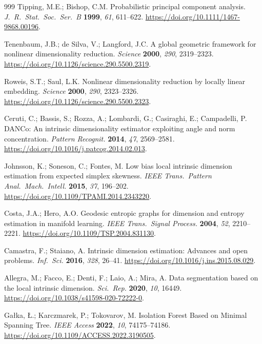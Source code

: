 \documentclass[make,article,submit,pdftex,moreauthors]{Definitions/mdpi}
\begin{document}
\begin{thebibliography}{999}
Tipping, M.E.; Bishop, C.M.
Probabilistic principal component analysis.
\textit{J.\ R.\ Stat.\ Soc.\ Ser.\ B} \textbf{1999}, \textit{61}, 611--622.
\url{https://doi.org/10.1111/1467-9868.00196}.

Tenenbaum, J.B.; de Silva, V.; Langford, J.C.
A global geometric framework for nonlinear dimensionality reduction.
\textit{Science} \textbf{2000}, \textit{290}, 2319--2323.
\url{https://doi.org/10.1126/science.290.5500.2319}.

Roweis, S.T.; Saul, L.K.
Nonlinear dimensionality reduction by locally linear embedding.
\textit{Science} \textbf{2000}, \textit{290}, 2323--2326.
\url{https://doi.org/10.1126/science.290.5500.2323}.

Ceruti, C.; Bassis, S.; Rozza, A.; Lombardi, G.; Casiraghi, E.;
Campadelli, P.
DANCo: An intrinsic dimensionality estimator exploiting angle and norm
concentration.
\textit{Pattern Recognit.} \textbf{2014}, \textit{47}, 2569--2581.
\url{https://doi.org/10.1016/j.patcog.2014.02.013}.

Johnsson, K.; Soneson, C.; Fontes, M.
Low bias local intrinsic dimension estimation from expected simplex
skewness.
\textit{IEEE Trans.\ Pattern Anal.\ Mach.\ Intell.} \textbf{2015},
\textit{37}, 196--202. \url{https://doi.org/10.1109/TPAMI.2014.2343220}.

Costa, J.A.; Hero, A.O.
Geodesic entropic graphs for dimension and entropy estimation in manifold
learning.
\textit{IEEE Trans.\ Signal Process.} \textbf{2004}, \textit{52},
2210--2221. \url{https://doi.org/10.1109/TSP.2004.831130}.

Camastra, F.; Staiano, A.
Intrinsic dimension estimation: Advances and open problems.
\textit{Inf.\ Sci.} \textbf{2016}, \textit{328}, 26--41.
\url{https://doi.org/10.1016/j.ins.2015.08.029}.

Allegra, M.; Facco, E.; Denti, F.; Laio, A.; Mira, A.
Data segmentation based on the local intrinsic dimension.
\textit{Sci.\ Rep.} \textbf{2020}, \textit{10}, 16449.
\url{https://doi.org/10.1038/s41598-020-72222-0}.

Ga{\l}ka, {\L}.; Karczmarek, P.; Tokovarov, M.
Isolation Forest Based on Minimal Spanning Tree.
\textit{IEEE Access} \textbf{2022}, \textit{10}, 74175--74186.
\url{https://doi.org/10.1109/ACCESS.2022.3190505}.


\end{thebibliography}
\end{document}
